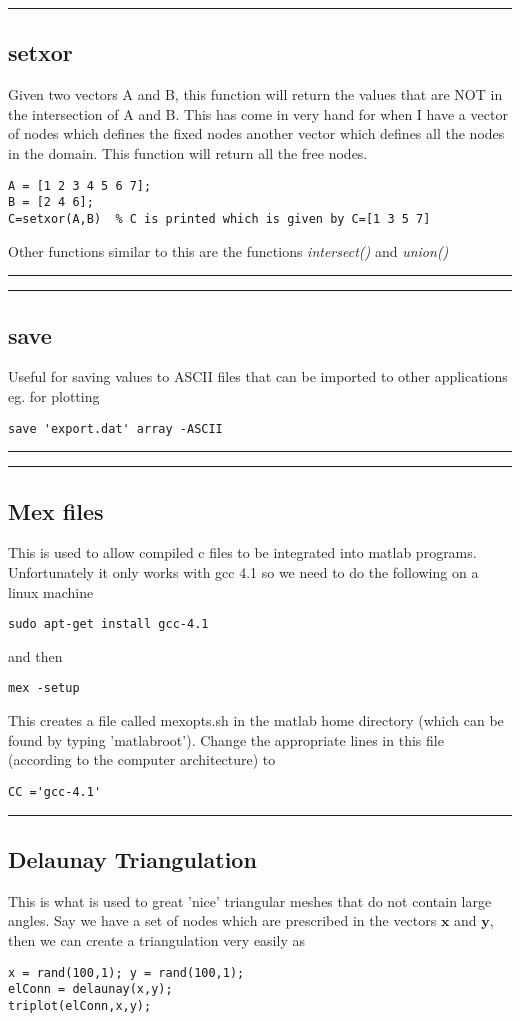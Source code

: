 \documentclass[a4paper, 10pt]{article}
\newcommand{\mytoprule}{\hrule\vspace{4mm}}
\newcommand{\mybotrule}{\vspace{4mm}\hrule}
\begin{document}
\mytoprule
\subsection*{setxor}
Given two vectors A and B, this function will return the values that are NOT in the intersection of A and B. This has come in very hand for when I have a vector of nodes which defines the fixed nodes another vector which defines all the nodes in the domain. This function will return all the free nodes. 
\begin{Verbatim}[commandchars=\\\{\}]
A = [1 2 3 4 5 6 7];
B = [2 4 6];
C=setxor(A,B)  % C is printed which is given by C=[1 3 5 7]
\end{Verbatim}
Other functions similar to this are the functions \emph{intersect()} and \emph{union()}
\mybotrule

\mytoprule
\subsection*{save}
Useful for saving values to ASCII files that can be imported to other applications eg. for plotting
\begin{Verbatim}[commandchars=\\\{\}]
save 'export.dat' array -ASCII
\end{Verbatim}
\mybotrule


\mytoprule
\subsection*{Mex files}
This is used to allow compiled c files to be integrated into matlab programs. Unfortunately it only works with gcc 4.1 so we need to do the following on a linux machine
\begin{Verbatim}
sudo apt-get install gcc-4.1
\end{Verbatim}
and then 
\begin{Verbatim}
mex -setup
\end{Verbatim}
This creates a file called mexopts.sh in the matlab home directory (which can be found by typing 'matlabroot'). Change the appropriate lines in this file (according to the computer architecture) to 
\begin{Verbatim}
CC ='gcc-4.1'
\end{Verbatim}
\mybotrule

\subsection*{Delaunay Triangulation}
This is what is used to great 'nice' triangular meshes that do not contain large angles. Say we have a set of nodes which are prescribed in the vectors $\mathbf{x}$ and $\mathbf{y}$, then we can create a triangulation very easily as
\begin{verbatim}
x = rand(100,1); y = rand(100,1);
elConn = delaunay(x,y);
triplot(elConn,x,y);
\end{verbatim}
\end{document}
